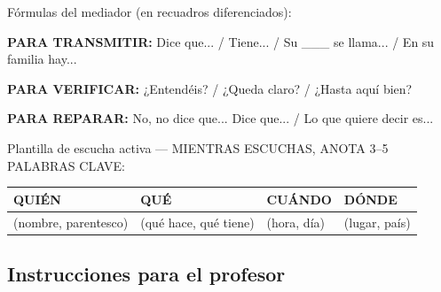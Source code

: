 \documentclass[a4paper,11pt]{article}
\begin{document}
\vspace{0.3cm}

Fórmulas del mediador (en recuadros diferenciados):

\vspace{0.2cm}

\noindent\colorbox{azulg!10}{\parbox{\dimexpr\linewidth-2\fboxsep}{%
\textbf{PARA TRANSMITIR:} Dice que... / Tiene... / Su \_\_\_ se llama... / En su familia hay...
}}

\vspace{0.2cm}

\noindent\colorbox{verde!10}{\parbox{\dimexpr\linewidth-2\fboxsep}{%
\textbf{PARA VERIFICAR:} ¿Entendéis? / ¿Queda claro? / ¿Hasta aquí bien?
}}

\vspace{0.2cm}

\noindent\colorbox{naranja!10}{\parbox{\dimexpr\linewidth-2\fboxsep}{%
\textbf{PARA REPARAR:} No, no dice que... Dice que... / Lo que quiere decir es...
}}

\vspace{0.3cm}

Plantilla de escucha activa — MIENTRAS ESCUCHAS, ANOTA 3--5 PALABRAS CLAVE:

\begin{center}
\renewcommand{\arraystretch}{1.5}
\begin{tabular}{|>{\centering\arraybackslash}p{3cm}|>{\centering\arraybackslash}p{3cm}|>{\centering\arraybackslash}p{3cm}|>{\centering\arraybackslash}p{3cm}|}
\hline
\rowcolor{violeta!15}
\textbf{QUIÉN} & \textbf{QUÉ} & \textbf{CUÁNDO} & \textbf{DÓNDE} \\
\hline
(nombre, parentesco) & (qué hace, qué tiene) & (hora, día) & (lugar, país) \\[0.5cm]
\hline
\end{tabular}
\end{center}

\vspace{0.2cm}

\begin{center}
\end{center}

\vspace{0.5cm}

\subsection*{Instrucciones para el profesor}
\end{document}
